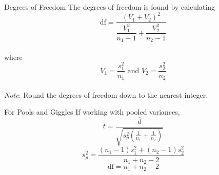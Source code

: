 \documentclass[t]{beamer}
\begin{document}
\begin{frame}{Degrees of Freedom}
The degrees of freedom is found by calculating
\[\text{df} = \dfrac{\left(V_1+V_2\right)^2}{\dfrac{V_1^2}{n_1-1} + \dfrac{V_2^2}{n_2-1}}\]
\newline\\
where
\[V_1 = \frac{s_1^2}{n_1} \text{ and } V_2 = \frac{s_2^2}{n_2}\]
\newline\\
\emph{Note}: Round the degrees of freedom down to the nearest integer.
\end{frame}

\begin{frame}{For Pools and Giggles}
If working with pooled variances,
\[t = \frac{\overline{d}}{\sqrt{s_p^2\left(\frac{1}{n_1}+\frac{1}{n_2}\right)}}\]
\bigskip
\[s_p^2 = \frac{(n_1-1)s_1^2+(n_2-1)s_2^2}{n_1+n_2-2}\]
\bigskip
\[\text{df} = n_1+n_2-2\]
\end{frame}
\end{document}
